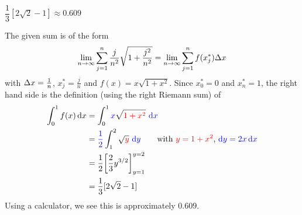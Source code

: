 \begin{answer}
$\dfrac{1}{3}[2\sqrt{2}-1]
\approx0.609$
\end{answer}

\begin{solution}
The given sum is of the form
\begin{align*}
\lim_{n\rightarrow\infty}\sum_{j=1}^n
             \frac{j}{n^2}\sqrt{1+\frac{j^2}{n^2}}
=\lim_{n\rightarrow\infty}\sum_{j=1}^n f(x_j^*)\Delta x
\end{align*}
with $\Delta x=\frac{1}{n}$, $x_j^*=\frac{j}{n}$ and $f(x)=x\sqrt{1+x^2}$.
Since $x_0^*=0$ and $x_n^*=1$, the right hand side is the definition
(using the right Riemann sum) of
\begin{align*}
\int_0^1 f(x)\,\dee{x}
&=\int_0^1 \textcolor{blue}{x}\sqrt{\textcolor{red}{1+x^2}}\ \textcolor{blue}{\dee{x}} \\
&=\textcolor{blue}{\frac{1}{2}}\int_1^2 \sqrt{\textcolor{red}{y}}\ \textcolor{blue}{\dee{y} }\qquad\text{with $\textcolor{red}{y=1+x^2}$, $\textcolor{blue}{\dee{y}=2x\,\dee{x}}$} \\
&=\frac{1}{2}{\left[\frac{2}{3}y^{3/2}\right]}_{y=1}^{y=2}\\
& =\frac{1}{3}[2\sqrt{2}-1]
\end{align*}
Using a calculator, we see this is approximately $0.609$.
\end{solution}




